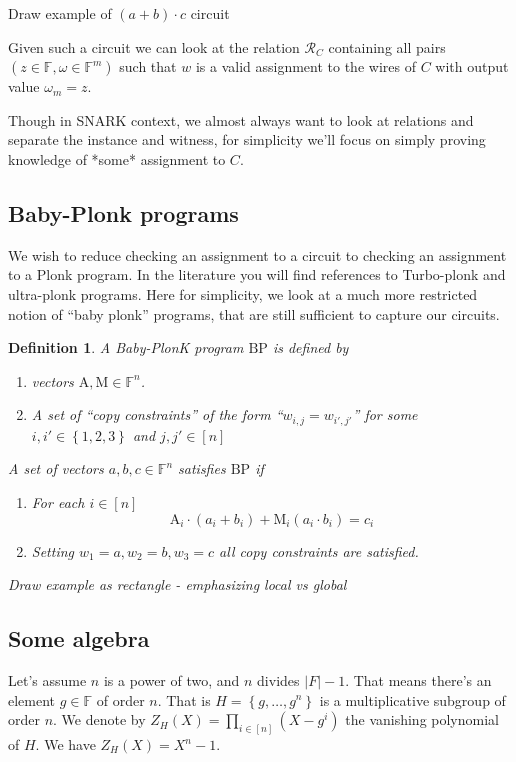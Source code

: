 \documentclass[11pt]{article} %
\newcommand{\F}{\ensuremath{\mathbb F}\xspace}
\newcommand{\wit}{\ensuremath{\omega}\xspace}
\newcommand{\relcirc}{\ensuremath{\mathcal{R}_C}\xspace}
\newcommand{\set}[1]{\ensuremath{\left\{#1\right\}}\xspace}
\newtheorem{dfn}[lemma]{Definition}
\newcommand{\add}{\ensuremath{\mathrm{A}}\xspace}
\newcommand{\mul}{\ensuremath{\mathrm{M}}\xspace}
\newcommand{\prog}{\ensuremath{\mathrm{BP}}\xspace}
\begin{document}
Draw example of $(a+b)\cdot c$ circuit


Given such a circuit we can look at the relation
\relcirc
containing all pairs $(z\in \F,\wit\in \F^m)$ such that
$w$ is a valid assignment to the wires of $C$ with output value $\wit_m=z$.

Though in SNARK context, we almost always want to look at relations and separate the instance and witness, for simplicity we'll focus on simply proving
knowledge of *some* assignment to $C$.

\subsection{Baby-Plonk programs}
We wish to reduce checking an assignment to a circuit to checking an assignment to a Plonk program.
In the literature you will find references to Turbo-plonk and ultra-plonk programs.
Here for simplicity, we look at a much more restricted notion of ``baby plonk'' programs, that are still sufficient to capture our circuits.

\begin{dfn}
 A \emph{Baby-PlonK} program \prog is defined by 
 \begin{enumerate}
  \item vectors $\add,\mul\in \F^n$.
 \item A set of  ``copy constraints'' of the form ``$w_{i,j}=w_{i',j'}$''  for some $i,i' \in \set{1,2,3}$ and $j,j' \in [n]$
 \end{enumerate}
 A set of vectors $a,b,c\in \F^n$ \emph{satisfies} \prog if 
 \begin{enumerate}
  \item For each $i\in [n]$ 
  \[\add_i \cdot (a_i+b_i) + \mul_i(a_i\cdot b_i) = c_i\]
  \item Setting $w_1=a,w_2=b,w_3=c$ all copy constraints are satisfied.
 \end{enumerate}
\textit{Draw example as rectangle - emphasizing local vs global}
\end{dfn}



\subsection{Some algebra}
Let's assume $n$ is a power of two, and $n$ divides $|F|-1$.
That means there's an element $g\in \F$ of order $n$.
That is $H=\set{g,\ldots,g^n}$ is a multiplicative subgroup of order $n$.
We denote by $Z_H(X)= \prod_{i\in [n]}(X-g^i)$ the vanishing polynomial of $H$.
We have $Z_H(X)=X^n-1$.
\end{document}
